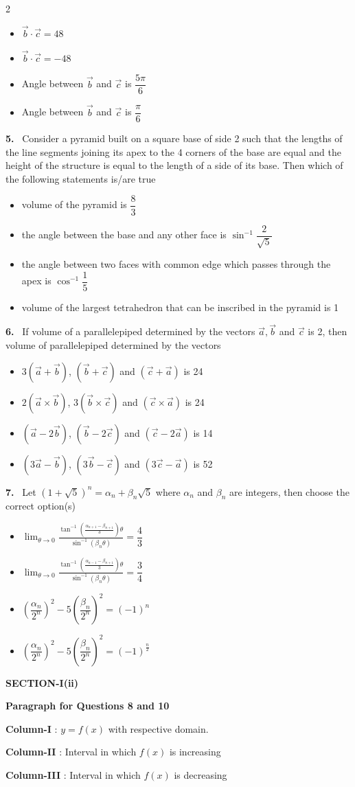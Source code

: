 \documentclass[10pt]{extarticle}
\newcommand{\sect}[1]{\par\smallskip\noindent\textbf{#1}\par}
\newcommand{\qn}[1]{\par\smallskip\noindent\textbf{#1.}~}
\newcommand{\paraq}[2]{\par\smallskip\noindent\textbf{Paragraph for Questions #1 and #2}\par}
\newenvironment{qoptions}{\begin{itemize}[leftmargin=1.8em,itemsep=1pt,topsep=2pt,label={}]}{\end{itemize}}
\newcommand{\opt}[2]{\item[(#1)] #2}
\begin{document}
\begin{multicols}{2}
\begin{qoptions}
\opt{A}{$\vec b\cdot\vec c=48$}
\opt{B}{$\vec b\cdot\vec c=-48$}
\opt{C}{Angle between $\vec b$ and $\vec c$ is $\dfrac{5\pi}6$}
\opt{D}{Angle between $\vec b$ and $\vec c$ is $\dfrac\pi6$}
\end{qoptions}
\qn{5} Consider a pyramid built on a square base of side 2 such that the lengths of the line segments joining its apex to the 4 corners of the base are equal and the height of the structure is equal to the length of a side of its base. Then which of the following statements is/are true
\begin{qoptions}
\opt{A}{volume of the pyramid is $\dfrac83$}
\opt{B}{the angle between the base and any other face is $\sin^{-1}\dfrac2{\sqrt5}$}
\opt{C}{the angle between two faces with common edge which passes through the apex is $\cos^{-1}\dfrac15$}
\opt{D}{volume of the largest tetrahedron that can be inscribed in the pyramid is 1}
\end{qoptions}
\qn{6} If volume of a parallelepiped determined by the vectors $\vec a,\vec b$ and $\vec c$ is 2, then volume of parallelepiped determined by the vectors
\begin{qoptions}
\opt{A}{$3(\vec a+\vec b)$, $(\vec b+\vec c)$ and $(\vec c+\vec a)$ is 24}
\opt{B}{$2(\vec a\times\vec b)$, $3(\vec b\times\vec c)$ and $(\vec c\times\vec a)$ is 24}
\opt{C}{$(\vec a-2\vec b)$, $(\vec b-2\vec c)$ and $(\vec c-2\vec a)$ is 14}
\opt{D}{$(3\vec a-\vec b)$, $(3\vec b-\vec c)$ and $(3\vec c-\vec a)$ is 52}
\end{qoptions}
\qn{7} Let $(1+\sqrt5)^n=\alpha_n+\beta_n\sqrt5$ where $\alpha_n$ and $\beta_n$ are integers, then choose the correct option(s)
\begin{qoptions}
\opt{A}{$\displaystyle\lim_{\theta\to0}\frac{\tan^{-1}\left(\frac{\alpha_{n+1}-\beta_{n+1}}3\right)\theta}{\sin^{-1}(\beta_n\theta)}=\dfrac43$}
\opt{B}{$\displaystyle\lim_{\theta\to0}\frac{\tan^{-1}\left(\frac{\alpha_{n-1}-\beta_{n+1}}3\right)\theta}{\sin^{-1}(\beta_n\theta)}=\dfrac34$}
\opt{C}{$\left(\dfrac{\alpha_n}{2^n}\right)^2-5\left(\dfrac{\beta_n}{2^n}\right)^2=(-1)^n$}
\opt{D}{$\left(\dfrac{\alpha_n}{2^n}\right)^2-5\left(\dfrac{\beta_n}{2^n}\right)^2=(-1)^{\frac n2}$}
\end{qoptions}
\sect{SECTION-I(ii)}
\paraq{8}{10}
\noindent\textbf{Column-I} : $y=f(x)$ with respective domain.\par
\noindent\textbf{Column-II} : Interval in which $f(x)$ is increasing\par
\noindent\textbf{Column-III} : Interval in which $f(x)$ is decreasing\par

\end{multicols}
\end{document}
